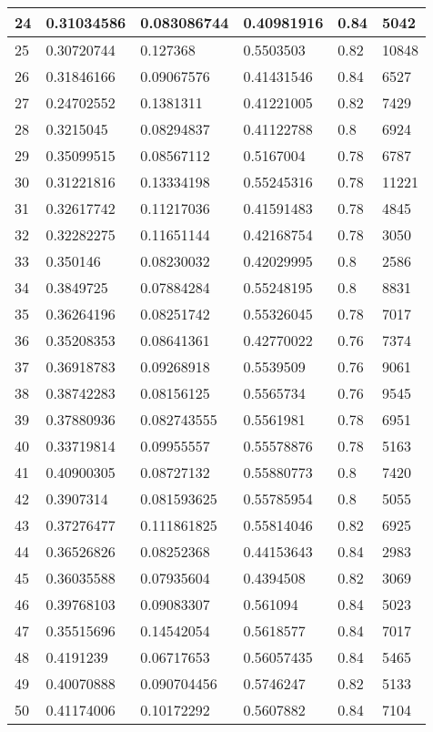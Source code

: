 \begin{longtable}{|l|l|l|l|l|l|}
24 & 0.31034586 & 0.083086744 & 0.40981916 & 0.84 & 5042 \\ \hline 
25 & 0.30720744 & 0.127368 & 0.5503503 & 0.82 & 10848 \\ \hline 
26 & 0.31846166 & 0.09067576 & 0.41431546 & 0.84 & 6527 \\ \hline 
27 & 0.24702552 & 0.1381311 & 0.41221005 & 0.82 & 7429 \\ \hline 
28 & 0.3215045 & 0.08294837 & 0.41122788 & 0.8 & 6924 \\ \hline 
29 & 0.35099515 & 0.08567112 & 0.5167004 & 0.78 & 6787 \\ \hline 
30 & 0.31221816 & 0.13334198 & 0.55245316 & 0.78 & 11221 \\ \hline 
31 & 0.32617742 & 0.11217036 & 0.41591483 & 0.78 & 4845 \\ \hline 
32 & 0.32282275 & 0.11651144 & 0.42168754 & 0.78 & 3050 \\ \hline 
33 & 0.350146 & 0.08230032 & 0.42029995 & 0.8 & 2586 \\ \hline 
34 & 0.3849725 & 0.07884284 & 0.55248195 & 0.8 & 8831 \\ \hline 
35 & 0.36264196 & 0.08251742 & 0.55326045 & 0.78 & 7017 \\ \hline 
36 & 0.35208353 & 0.08641361 & 0.42770022 & 0.76 & 7374 \\ \hline 
37 & 0.36918783 & 0.09268918 & 0.5539509 & 0.76 & 9061 \\ \hline 
38 & 0.38742283 & 0.08156125 & 0.5565734 & 0.76 & 9545 \\ \hline 
39 & 0.37880936 & 0.082743555 & 0.5561981 & 0.78 & 6951 \\ \hline 
40 & 0.33719814 & 0.09955557 & 0.55578876 & 0.78 & 5163 \\ \hline 
41 & 0.40900305 & 0.08727132 & 0.55880773 & 0.8 & 7420 \\ \hline 
42 & 0.3907314 & 0.081593625 & 0.55785954 & 0.8 & 5055 \\ \hline 
43 & 0.37276477 & 0.111861825 & 0.55814046 & 0.82 & 6925 \\ \hline 
44 & 0.36526826 & 0.08252368 & 0.44153643 & 0.84 & 2983 \\ \hline 
45 & 0.36035588 & 0.07935604 & 0.4394508 & 0.82 & 3069 \\ \hline 
46 & 0.39768103 & 0.09083307 & 0.561094 & 0.84 & 5023 \\ \hline 
47 & 0.35515696 & 0.14542054 & 0.5618577 & 0.84 & 7017 \\ \hline 
48 & 0.4191239 & 0.06717653 & 0.56057435 & 0.84 & 5465 \\ \hline 
49 & 0.40070888 & 0.090704456 & 0.5746247 & 0.82 & 5133 \\ \hline 
50 & 0.41174006 & 0.10172292 & 0.5607882 & 0.84 & 7104 \\ \hline 
\end{longtable}